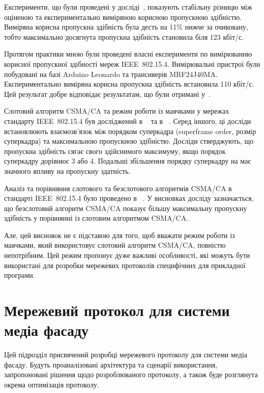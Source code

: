 \documentclass[a4paper,ukrainian,utf8,nocolumnsxix,floatsection,equationsection]{eskdtext}
\newcommand{\iee}[0]{IEEE~802.15.4\xspace}
\newcommand{\csma}[0]{CSMA/CA\xspace}
\begin{document}
Експерименти, що були проведені у досліді~\cite{thoroughput:analysis:unslotted:ieee}, показують стабільну різницю між оціненою та експериментально виміряною корисною пропускною здібністю. Виміряна корисна пропускна здібність була десть на 11\% нижче за очиковану, тобто максимально досягнута пропускна здібність становила біля 123 кбіт/с.

Протягом практики мною були проведені власні експерименти по вимірюванню корисної пропускної здібності мереж \iee. Вимірювальні пристрої були побудовані на базі Arduino Leonardo та трансиверів MRF24J40MA. Експериментально виміряна корисна пропускна здібність встановила 110 кбіт/с. Цей результат добре відповідає результатам, що були отримані у~\cite{thoroughput:analysis:unslotted:ieee}.

Слотовий алгоритм \csma та режим роботи із маячками у мережах стандарту \iee був досліджений в ~\cite{simulation:study:slotted:ieee} та в ~\cite{gts:allocation:analysis}. Серед іншого, ці досліди встановлюють взаємозв'язок між порядком суперкадра (superframe order, розмір суперкадра) та максимальною пропускною здібністю. Досліди стверджують, що пропускна здібність сягає свого здійснимого максимуму, якщо порядок суперкадру дорівнює 3 або 4. Подальші збільшення порядку суперкадру на має значного впливу на пропускну здатність.

Аналіз та порівняння слотового та безслотового алгоритмів \csma в стандарті \iee було проведено в ~\cite{analysis:slotted:unslotted}. У висновках досліду зазначається, що безслотовий алгоритм \csma  показує більшу максимальну пропускну здібність у порівнянні із слотовим алгоритмом \csma.

Але, цей висновок не є підставою для того, щоб вважати режим роботи із маячками, який використовує слотовий алгоритм \csma, повністю непотрібним. Цей режим пропонує дуже важливі особливості, які можуть бути використані для розробки мережевих протоколів специфічних для прикладної програми.

\section{Мережевий протокол для системи медіа фасаду}
\label{sec:network:protocol:amf}


Цей підрозділ присвячений розробці мережевого протоколу для системи медіа фасаду. Будуть проаналізовані архітектура та сценарії використання, запропоновані рішення щодо розроблюваного протоколу, а також буде розглянута окрема оптимізація протоколу.
\end{document}
